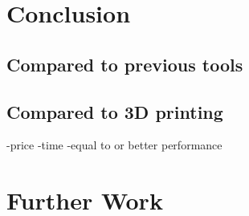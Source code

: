 \documentclass[a4paper]{report}
\begin{document}
\chapter{Conclusion} \label{Conclusion}

\section{Compared to previous tools}

\section{Compared to 3D printing}
-price
-time
-equal to or better performance

\chapter{Further Work} \label{Further Work}

\appendix



%
%
\printbibliography
\end{document}
